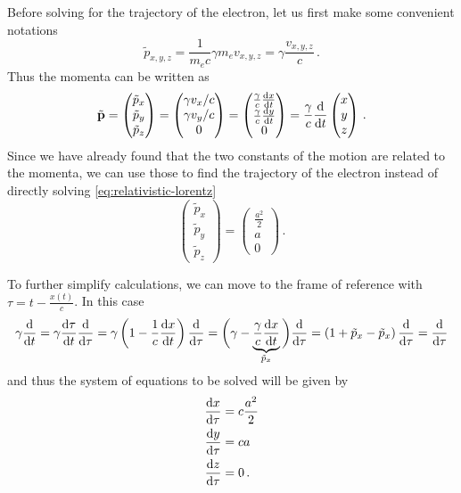 \documentclass[12pt, class=report, crop=false]{standalone}
\begin{document}
Before solving for the trajectory of the electron, let us first make some convenient
notations
\[
\tilde{p}_{x,y,z}=\frac{1}{m_e c}\gamma m_e v_{x,y,z} = \gamma \frac{v_{x,y,z}}{c}\,.
\]
Thus the momenta can be written as
\[
\tilde{\vb{p}} =
\begin{pmatrix}
  \tilde{p}_x \\
  \tilde{p}_y \\
  \tilde{p}_z
\end{pmatrix} =
\begin{pmatrix}
  \gamma v_x/c \\
  \gamma v_y/c \\
  0
\end{pmatrix} =
\begin{pmatrix}
  \frac{\gamma}{c}\dv{x}{t} \\
  \frac{\gamma}{c}\dv{y}{t} \\
  0
\end{pmatrix} =
\frac{\gamma}{c} \dv{t}
\begin{pmatrix}
  x \\ y \\ z
\end{pmatrix}\,.
\]
Since we have already found that the two constants of the motion are related
to the momenta, we can use those to find the trajectory of the electron
instead of directly solving \cref{eq:relativistic-lorentz}
\[
\begin{pmatrix}
  \tilde{p}_x \\
  \tilde{p}_y \\
  \tilde{p}_z
\end{pmatrix} =
\begin{pmatrix}
  \frac{a^2}2 \\
  a \\
  0
\end{pmatrix}\,.
\]

To further simplify calculations, we can move to the frame of reference with
\(\tau = t - \frac{x(t)}{c}\). In this case
\[
\gamma \dv{t} = \gamma \dv{\tau}{t}\dv{\tau} =
\gamma \left(1-\frac{1}{c}\dv{x}{t}\right)\dv{\tau} =
\bigg(\gamma-\underbrace{\frac{\gamma}{c}\dv{x}{t}}_{\tilde{p}_x}\bigg)\dv{\tau} =
\left(1+\tilde{p}_x - \tilde{p}_x\right)\dv{\tau} =
\dv{\tau}
\]
and thus the system of equations to be solved will be given by
\begin{equation}
\label{eq:trajectory-eq}
\begin{aligned}
  \dv{x}{\tau} &= c \frac{a^2}{2} \\
  \dv{y}{\tau} &= c a \\
  \dv{z}{\tau} &= 0\,.
\end{aligned}
\end{equation}
\end{document}
